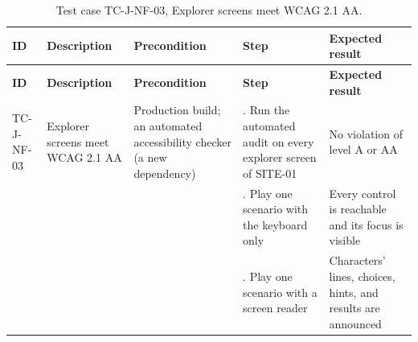 {\small
\begin{longtable}{|>{\raggedright\arraybackslash}p{}|>{\raggedright\arraybackslash}p{}|>{\raggedright\arraybackslash}p{}|>{\raggedright\arraybackslash}p{}|>{\raggedright\arraybackslash}p{}|}
\caption{Test case TC-J-NF-03, Explorer screens meet WCAG 2.1 AA.} \\
\hline
\textbf{ID} & \textbf{Description} & \textbf{Precondition} & \textbf{Step} & \textbf{Expected result} \\ \hline
\endfirsthead
\hline
\textbf{ID} & \textbf{Description} & \textbf{Precondition} & \textbf{Step} & \textbf{Expected result} \\ \hline
\endhead
TC-J-NF-03 & Explorer screens meet WCAG 2.1 AA & Production build; an automated accessibility checker (a new dependency) & 1. Run the automated audit on every explorer screen of SITE-01 & No violation of level A or AA \\ \hline
 &  &  & 2. Play one scenario with the keyboard only & Every control is reachable and its focus is visible \\ \hline
 &  &  & 3. Play one scenario with a screen reader & Characters' lines, choices, hints, and results are announced \\ \hline
\end{longtable}
}

